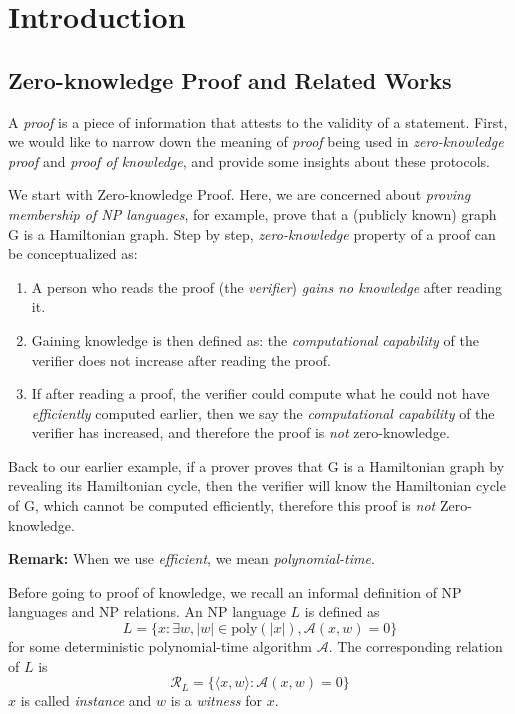 \chapter{Introduction}
\label{chap-introduction}

\section{Zero-knowledge Proof and Related Works}

A \textit{proof} is a piece of information that attests to the validity of a statement. First, we would like to narrow down the meaning of \textit{proof} being used in \textit{zero-knowledge proof} and \textit{proof of knowledge}, and provide some insights about these protocols.

We start with Zero-knowledge Proof. Here, we are concerned about \textit{proving membership of NP languages}, for example, prove that a (publicly known) graph G is a Hamiltonian graph.
Step by step, \textit{zero-knowledge} property of a proof can be conceptualized as: \cite{goldreich2007foundations}
\begin{enumerate}
    \item A person who reads the proof (the \textit{verifier}) \textit{gains no knowledge} after reading it.
    \item Gaining knowledge is then defined as: the \textit{computational capability} of the verifier does not increase after reading the proof.
    \item If after reading a proof, the verifier could compute what he could not have \textit{efficiently} computed earlier, then we say the \textit{computational capability} of the verifier has increased, and therefore the proof is \textit{not} zero-knowledge.
\end{enumerate}

Back to our earlier example, if a prover proves that G is a Hamiltonian graph by revealing its Hamiltonian cycle, then the verifier will know the Hamiltonian cycle of G, which cannot be computed efficiently, therefore this proof is \textit{not} Zero-knowledge.

\textbf{Remark:} When we use \textit{efficient}, we mean \textit{polynomial-time}.

Before going to proof of knowledge, we recall an informal definition of NP languages and NP relations. An NP language $L$ is defined as
$$L = \{x: \exists w, |w| \in \mathrm{poly}(|x|), \mathcal{A}(x, w) = 0\}$$
for some deterministic polynomial-time algorithm $\mathcal{A}$. The corresponding relation of $L$ is
$$\mathcal{R}_L = \{ \langle x, w \rangle : \mathcal{A}(x, w) = 0\}$$
$x$ is called \textit{instance} and $w$ is a \textit{witness} for $x$.

